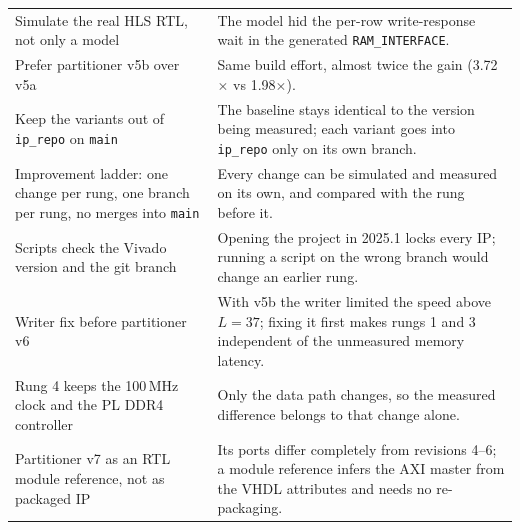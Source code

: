 \documentclass[11pt,a4paper]{article}
\newcommand{\code}[1]{\texttt{#1}}
\begin{document}
\begin{longtable}{@{}p{}p{}@{}}
Simulate the real HLS RTL, not only a model & The model hid the per-row write-response wait in the generated \code{RAM\_INTERFACE}. \\
Prefer partitioner v5b over v5a & Same build effort, almost twice the gain (3.72$\times$ vs 1.98$\times$). \\
Keep the variants out of \code{ip\_repo} on \code{main} & The baseline stays identical to the version being measured; each variant goes into \code{ip\_repo} only on its own branch. \\
Improvement ladder: one change per rung, one branch per rung, no merges into \code{main} & Every change can be simulated and measured on its own, and compared with the rung before it. \\
Scripts check the Vivado version and the git branch & Opening the project in 2025.1 locks every IP; running a script on the wrong branch would change an earlier rung. \\
Writer fix before partitioner v6 & With v5b the writer limited the speed above $L = 37$; fixing it first makes rungs 1 and 3 independent of the unmeasured memory latency. \\
Rung 4 keeps the 100\,MHz clock and the PL DDR4 controller & Only the data path changes, so the measured difference belongs to that change alone. \\
Partitioner v7 as an RTL module reference, not as packaged IP & Its ports differ completely from revisions 4--6; a module reference infers the AXI master from the VHDL attributes and needs no re-packaging. \\
\bottomrule
\end{longtable}

\end{document}
